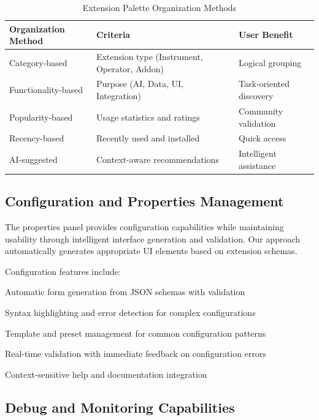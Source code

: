 \begin{table}[ht]
\centering
\begin{tabular}{@{}lll@{}}
\toprule
\textbf{Organization Method} & \textbf{Criteria} & \textbf{User Benefit} \\
\midrule
Category-based & Extension type (Instrument, Operator, Addon) & Logical grouping \\
Functionality-based & Purpose (AI, Data, UI, Integration) & Task-oriented discovery \\
Popularity-based & Usage statistics and ratings & Community validation \\
Recency-based & Recently used and installed & Quick access \\
AI-suggested & Context-aware recommendations & Intelligent assistance \\
\bottomrule
\end{tabular}
\caption{Extension Palette Organization Methods}
\end{table}

\subsection*{Configuration and Properties Management}

The properties panel provides configuration capabilities while maintaining usability through intelligent interface generation and validation. Our approach automatically generates appropriate UI elements based on extension schemas.

Configuration features include:

\begin{compactlist}
    \item Automatic form generation from JSON schemas with validation
    \item Syntax highlighting and error detection for complex configurations
    \item Template and preset management for common configuration patterns
    \item Real-time validation with immediate feedback on configuration errors
    \item Context-sensitive help and documentation integration
\end{compactlist}

\subsection*{Debug and Monitoring Capabilities}

